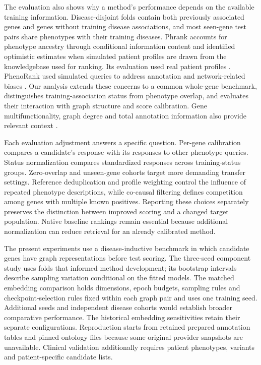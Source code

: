 \documentclass[webpdf,contemporary,large]{oup-authoring-template}%
\theoremstyle{thmstyleone}%
\theoremstyle{thmstyletwo}%
\theoremstyle{thmstylethree}%
\renewcommand{\cite}{\citep}
\begin{document}
The evaluation also shows why a method's performance depends on the available
training information. Disease-disjoint folds contain both previously
associated genes and genes without training disease associations, and most
seen-gene test pairs share phenotypes with their training diseases. Phrank
accounts for phenotype ancestry through conditional information content and
identified optimistic estimates when simulated patient profiles are drawn from
the knowledgebase used for ranking. Its evaluation used real patient profiles
\cite{jagadeesh2019phrank}. PhenoRank
used simulated queries to address annotation and network-related biases
\cite{cornish2018phenorank}. Our analysis extends these concerns to a common
whole-gene benchmark, distinguishes training-association status from phenotype
overlap, and evaluates their interaction with graph structure and score
calibration. Gene multifunctionality, graph degree and total annotation
information also provide relevant context
\cite{gillis2011multifunctional,zietz2024degree,alghamdi2022contribution}.

Each evaluation adjustment answers a specific question. Per-gene calibration
compares a candidate's response with its responses to other phenotype queries.
Status normalization compares standardized responses across training-status
groups. Zero-overlap and unseen-gene cohorts target more demanding transfer
settings. Reference deduplication and profile weighting control the influence
of repeated phenotype descriptions, while co-causal filtering defines
competition among genes with multiple known positives. Reporting these choices
separately preserves the distinction between improved scoring and a changed
target population. Native baseline rankings remain essential because additional
normalization can reduce retrieval for an already calibrated method.

The present experiments use a disease-inductive benchmark in which candidate
genes have graph representations before test scoring. The three-seed
component study uses folds that informed method development; its bootstrap
intervals describe sampling variation conditional on the fitted
models. The matched embedding comparison holds dimensions, epoch budgets,
sampling rules and checkpoint-selection rules fixed within each graph pair
and uses one training seed. Additional seeds and independent disease cohorts
would establish broader comparative performance. The historical embedding
sensitivities retain their separate configurations. Reproduction starts from retained prepared annotation
tables and pinned ontology files because some original provider snapshots are
unavailable. Clinical validation additionally requires patient phenotypes,
variants and patient-specific candidate lists.
\end{document}
